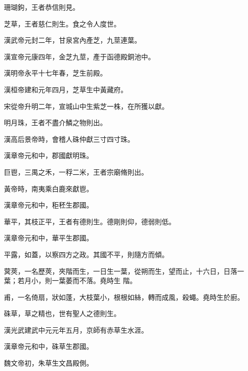 \begin{pinyinscope}
珊瑚鉤，王者恭信則見。



 芝草，王者慈仁則生。食之令人度世。



 漢武帝元封二年，甘泉宮內產芝，九莖連葉。



 漢宣帝元康四年，金芝九莖，產于函德殿銅池中。



 漢明帝永平十七年春，芝生前殿。



 漢桓帝建和元年四月，芝草生中黃藏府。



 宋從帝升明二年，宣城山中生紫芝一株，在所獲以獻。



 明月珠，王者不盡介鱗之物則出。



 漢高后景帝時，會稽人硃仲獻三寸四寸珠。



 漢章帝元和中，郡國獻明珠。



 巨鬯，三禺之禾，一稃二米，王者宗廟脩則出。



 黃帝時，南夷乘白鹿來獻鬯。



 漢章帝元和中，秬秠生郡國。



 華平，其枝正平，王者有德則生。德剛則仰，德弱則低。



 漢章帝元和中，華平生郡國。


平露，如蓋，以察四方之政。其國不平，則隨方而傾。


蓂莢，一名歷莢，夾階而生，一日生一葉，從朔而生，望而止，十六日，日落一葉；若月小，則一葉萎而不落。堯時生
 階。


甫，一名倚扇，狀如蓬，大枝葉小，根根如絲，轉而成風，殺蠅。堯時生於廚。



 硃草，草之精也，世有聖人之德則生。



 漢光武建武中元元年五月，京師有赤草生水涯。



 漢章帝元和中，硃草生郡國。



 魏文帝初，朱草生文昌殿側。




\end{pinyinscope}

